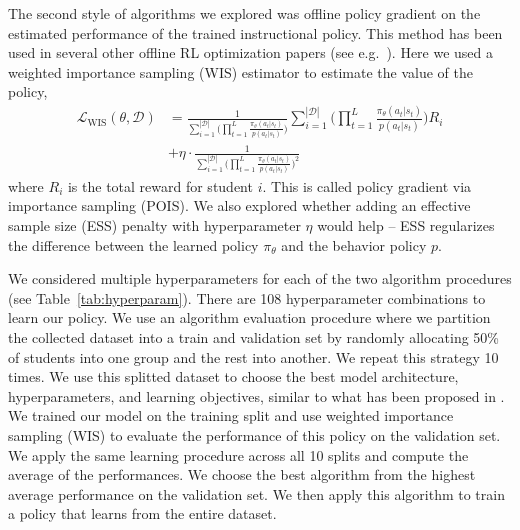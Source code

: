 \documentclass[sn-mathphys,Numbered]{sn-jnl}%
\theoremstyle{thmstyleone}%
\theoremstyle{thmstyletwo}%
\theoremstyle{thmstylethree}%
\begin{document}
The second style of algorithms we explored was offline policy gradient on the estimated performance of the trained instructional policy. This method has been used in several other offline RL optimization papers (see e.g.~\cite{metelli2018policy,liu2020off}). Here we used a weighted importance sampling (WIS) estimator to estimate the value of the policy, 
\begin{align}
   \mathcal{L}_{\text{WIS}}(\theta, \mathcal{D}) &= \frac{1}{\sum_{i=1}^{|\mathcal{D}|} \big( \prod_{t=1}^L \frac{\pi_\theta(a_t|s_t)}{p(a_t | s_t)} \big)} \sum_{i=1}^{|\mathcal{D}|} \Big( \prod_{t=1}^L \frac{\pi_\theta(a_t|s_t)}{p(a_t | s_t)} \Big) R_i \\
    & + \eta \cdot \frac{1}{\sum_{i=1}^{|\mathcal{D}|} \big( \prod_{t=1}^L \frac{\pi_\theta(a_t|s_t)}{p(a_t | s_t)} \big)^2}
\end{align}
where $R_i$ is the total reward for student $i$. This is called policy gradient via importance sampling (POIS). We also explored whether adding an effective sample size (ESS) penalty with hyperparameter $\eta$ would help -- ESS regularizes the difference between the learned policy $\pi_\theta$ and the behavior policy $p$.

We considered multiple hyperparameters for each of the two algorithm procedures (see Table~\ref{tab:hyperparam}). There are 108 hyperparameter combinations to learn our policy. We use an algorithm evaluation procedure where we partition the collected dataset into a train and validation set by randomly allocating 50\% of students into one group and the rest into another. We repeat this strategy 10 times. We use this splitted dataset to choose the best model architecture, hyperparameters, and learning objectives, similar to what has been proposed in \cite{nie2022data}. We trained our model on the training split and use weighted importance sampling (WIS) to evaluate the performance of this policy on the validation set. We apply the same learning procedure across all 10 splits and compute the average of the performances. We choose the best algorithm from the highest average performance on the validation set. We then apply this algorithm to train a policy that learns from the entire dataset.
\end{document}
